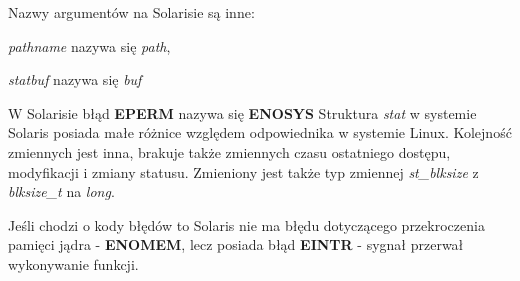 \documentclass{article}
\begin{document}
Nazwy argumentów na Solarisie są inne:

\textit{pathname} nazywa się \textit{path},

\textit{statbuf} nazywa się \textit{buf}

W Solarisie  błąd \textbf{EPERM} nazywa się \textbf{ENOSYS}
Struktura \textit{stat} w systemie Solaris posiada małe różnice względem odpowiednika w systemie Linux.
Kolejność zmiennych jest inna, brakuje także zmiennych czasu ostatniego dostępu, modyfikacji i zmiany statusu.
Zmieniony jest także typ zmiennej \textit{st\_blksize} z \textit{blksize\_t} na \textit{long}.

Jeśli chodzi o kody błędów to Solaris nie ma błędu dotyczącego przekroczenia pamięci jądra - \textbf{ENOMEM}, lecz posiada błąd \textbf{EINTR} - sygnał przerwał wykonywanie funkcji.
\end{document}

